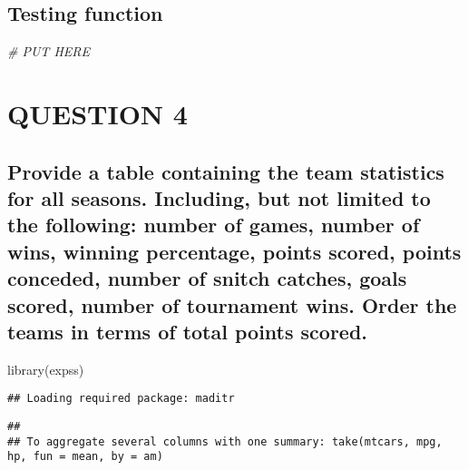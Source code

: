 \documentclass[
]{article}
\newenvironment{Shaded}{\begin{snugshade}}{\end{snugshade}}
\newcommand{\CommentTok}[1]{\textcolor[rgb]{0.56,0.35,0.01}{\textit{#1}}}
\newcommand{\FunctionTok}[1]{\textcolor[rgb]{0.00,0.00,0.00}{#1}}
\newcommand{\NormalTok}[1]{#1}
\begin{document}
\hypertarget{testing-function}{%
\subsection{Testing function}\label{testing-function}}

\begin{Shaded}
\begin{Highlighting}[]
\CommentTok{\# PUT HERE}
\end{Highlighting}
\end{Shaded}

\hypertarget{question-4}{%
\section{QUESTION 4}\label{question-4}}

\hypertarget{provide-a-table-containing-the-team-statistics-for-all-seasons.-including-but-not-limited-to-the-following-number-of-games-number-of-wins-winning-percentage-points-scored-points-conceded-number-of-snitch-catches-goals-scored-number-of-tournament-wins.-order-the-teams-in-terms-of-total-points-scored.}{%
\subsection{Provide a table containing the team statistics for all
seasons. Including, but not limited to the following: number of games,
number of wins, winning percentage, points scored, points conceded,
number of snitch catches, goals scored, number of tournament wins. Order
the teams in terms of total points
scored.}\label{provide-a-table-containing-the-team-statistics-for-all-seasons.-including-but-not-limited-to-the-following-number-of-games-number-of-wins-winning-percentage-points-scored-points-conceded-number-of-snitch-catches-goals-scored-number-of-tournament-wins.-order-the-teams-in-terms-of-total-points-scored.}}

\begin{Shaded}
\begin{Highlighting}[]
\FunctionTok{library}\NormalTok{(expss)}
\end{Highlighting}
\end{Shaded}

\begin{verbatim}
## Loading required package: maditr
\end{verbatim}

\begin{verbatim}
## 
## To aggregate several columns with one summary: take(mtcars, mpg, hp, fun = mean, by = am)
\end{verbatim}
\end{document}
